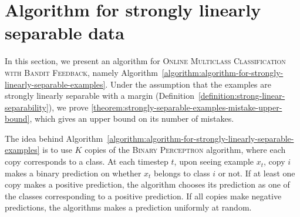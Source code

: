\section{Algorithm for strongly linearly separable data}
\label{section:algorithm-for-strongly-linearly-separable-data}

In this section, we present an algorithm for \textsc{Online Multiclass
Classification with Bandit Feedback}, namely Algorithm~\ref{algorithm:algorithm-for-strongly-linearly-separable-examples}.
Under the assumption that the examples are strongly linearly separable
with a margin (Definition~\ref{definition:strong-linear-separability}),
we prove \autoref{theorem:strongly-separable-examples-mistake-upper-bound},
which gives an upper bound on its number of mistakes.


The idea behind Algorithm~\ref{algorithm:algorithm-for-strongly-linearly-separable-examples}
 is to use $K$ copies of the \textsc{Binary
Perceptron} algorithm,
where each copy corresponds to a class. At each timestep $t$, upon seeing
example $x_t$,
copy $i$ makes a binary prediction on whether $x_t$ belongs to
class $i$ or not. If at least one copy makes a positive prediction, the
algorithm chooses its prediction as one of the classes corresponding to a
positive prediction. If all copies make negative predictions, the algorithms
makes a prediction uniformly at random.

